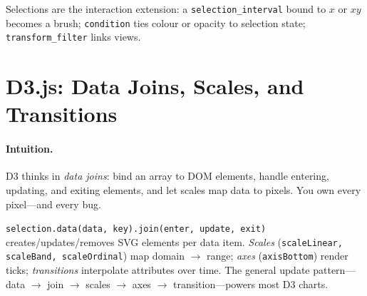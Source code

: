 Selections are the interaction extension: a \texttt{selection\_interval} bound to $x$ or $xy$ becomes a brush; \texttt{condition} ties colour or opacity to selection state; \texttt{transform\_filter} links views.

\section{D3.js: Data Joins, Scales, and Transitions}
\label{sec:d3}
\paragraph{Intuition.} D3 thinks in \emph{data joins}: bind an array to DOM elements, handle entering, updating, and exiting elements, and let scales map data to pixels. You own every pixel---and every bug.

\begin{definition}[D3 join]\label{def:d3-join}
\texttt{selection.data(data, key).join(enter, update, exit)} creates/updates/removes SVG elements per data item. \emph{Scales} (\texttt{scaleLinear, scaleBand, scaleOrdinal}) map domain $\to$ range; \emph{axes} (\texttt{axisBottom}) render ticks; \emph{transitions} interpolate attributes over time. The general update pattern---data $\to$ join $\to$ scales $\to$ axes $\to$ transition---powers most D3 charts.
\end{definition}

